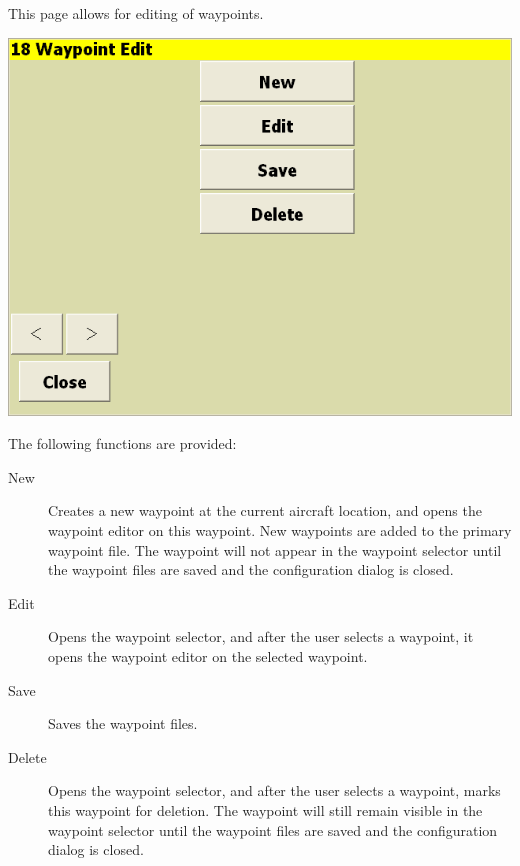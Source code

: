 \documentclass[a4paper,12pt]{refrep}
\begin{document}
 This page allows for editing of waypoints.

\begin{center}
\includegraphics[angle=0,width=\linewidth,keepaspectratio='true']{figures/wayedit-1.png}
\end{center}

 The following functions are provided:
\begin{description}
\item[New]  Creates a new waypoint at the current aircraft location, and opens the waypoint
 editor on this waypoint.  New waypoints are added to the primary waypoint file.  
  The waypoint will not appear in the waypoint selector until the waypoint files are saved
and the configuration dialog is closed.
\item[Edit]  Opens the waypoint selector, and after the user selects a waypoint, it opens
  the waypoint editor on the selected waypoint.
\item[Save]  Saves the waypoint files.
\item[Delete]  Opens the waypoint selector, and after the user selects a waypoint, marks
this waypoint for deletion.  The waypoint will still remain visible in
the waypoint selector until the waypoint files are saved and the configuration dialog is
closed.
\end{description}
\end{document}

